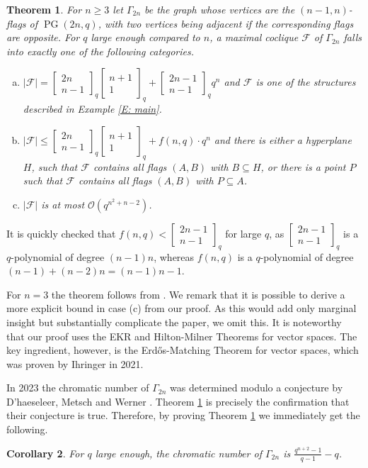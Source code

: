 \documentclass[11pt, oneside, a4paper]{article}
\newtheorem{thm}{Theorem}[section]
\newtheorem{cor}[thm]{Corollary}
\newcommand{\EKR}{\mathcal{F}}
\newcommand{\OO}{\mathcal{O}}
\newcommand{\Gauss}[2]{{\begin{bmatrix} #1 \\ #2 \end{bmatrix}_q}}
\DeclareMathOperator{\PG}{PG}
\begin{document}
\begin{thm} \label{T: main}
For $n\geq 3$ let $\Gamma_{2n}$ be the graph whose vertices are the $(n-1,n)$-flags of $\PG(2n,q)$, with two vertices being adjacent if the corresponding flags are opposite. For $q$ large enough compared to $n$, a maximal coclique $\EKR$ of $\Gamma_{2n}$ falls into exactly one of the following categories.
\begin{enumerate} [(a)]
    \item $|\EKR|=\Gauss{2n}{n-1} \Gauss{n+1}{1} +\Gauss{2n-1}{n-1}q^n$ and $\EKR$ is one of the structures described in Example \ref{E: main}.
    \item $|\EKR|\leq \Gauss{2n}{n-1} \Gauss{n+1}{1} +f(n,q)\cdot q^n$ and there is either a hyperplane $H$, such that $\EKR$ contains all flags $(A,B)$ with $B\subseteq H$, or there is a point $P$ such that $\EKR$ contains all flags $(A,B)$ with $P\subseteq A$.
    \item $|\EKR|$ is at most $\OO(q^{n^2+n-2})$.
\end{enumerate}
\end{thm}

It is quickly checked that $f(n,q)<\Gauss{2n-1}{n-1}$ for large $q$, as $\Gauss{2n-1}{n-1}$ is a $q$-polynomial of degree $(n-1)n$, whereas $f(n,q)$ is a $q$-polynomial of degree $(n-1)+(n-2)n=(n-1)n-1$.

For $n=3$ the theorem follows from \cite{werner_metsch}. 
We remark that it is possible to derive a more explicit bound in case (c) from our proof.
As this would add only marginal insight but substantially complicate the paper, we omit this.
It is noteworthy that our proof uses the EKR and Hilton-Milner Theorems for vector spaces.
The key ingredient, however, is the Erd\H{o}s-Matching Theorem for vector spaces, which was proven by Ihringer in 2021.


In 2023 the chromatic number of $\Gamma_{2n}$ was determined modulo a conjecture by D'haeseleer, Metsch and Werner \cite{Jozefien_some}. Theorem \ref{T: main} is precisely the confirmation that their conjecture is true. Therefore, by proving Theorem \ref{T: main} we immediately get the following.

\begin{cor}
    For $q$ large enough, the chromatic number of $\Gamma_{2n}$ is $\frac{q^{n+2}-1}{q-1}-q$.
\end{cor}
\end{document}
